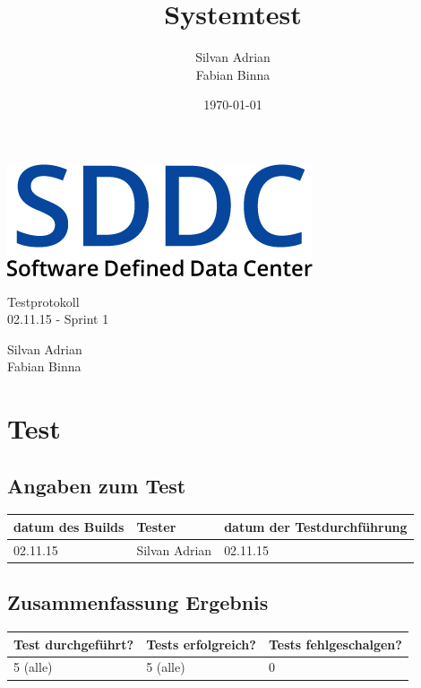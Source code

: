 \documentclass[11pt]{scrartcl}
\title{Systemtest}
\author{Silvan Adrian \\ Fabian Binna}
\date{\today{}}
\begin{document}
\def\arraystretch{1.5}
\begin{titlepage}
\begin{center}
\vspace{10em}
\includegraphics[scale=2]{SDDC}
\vspace{10em}
\end{center}
\begin{center}
\huge {Testprotokoll}\\
\huge {02.11.15 - Sprint 1}\\
\end{center}
\begin{center}
\vspace{10em}
\LARGE {Silvan Adrian} \\
\LARGE {Fabian Binna}
\end{center}

\end{titlepage}


\newpage
\tableofcontents
\newpage

\section{Test}
\subsection{Angaben zum Test}

\begin{tabularx}{\linewidth}{l l l}
\textbf{datum des Builds} & \textbf{Tester} & \textbf{datum der Testdurchführung}\\
\hline
02.11.15 & Silvan Adrian & 02.11.15

\end{tabularx}

\subsection{Zusammenfassung Ergebnis}
\begin{tabularx}{\linewidth}{l l l}
\textbf{Test durchgeführt?} & \textbf{Tests erfolgreich?} & \textbf{Tests fehlgeschalgen?}\\
\hline
5 (alle) & 5 (alle) & 0 \\
\hline
\end{tabularx}
\end{document}
